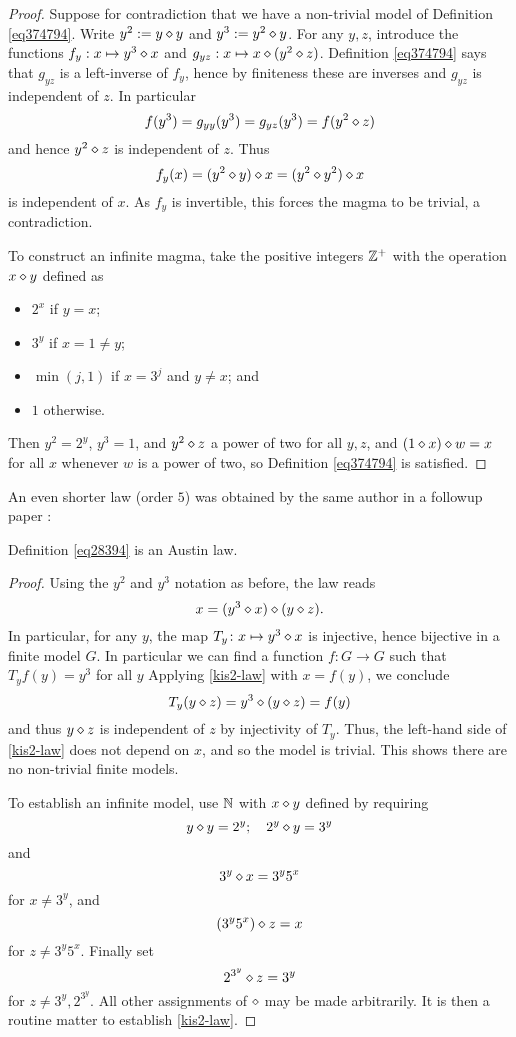 \begin{proof} \leanok Suppose for contradiction that we have a non-trivial model of Definition \ref{eq374794}. Write $y^2 := y \diamond y$ and $y^3 := y^2 \diamond y$. For any $y,z$, introduce the functions $f_y: x \mapsto y^3 \diamond x$ and $g_{yz}: x \mapsto x \diamond (y^2 \diamond z)$.  Definition \ref{eq374794} says that $g_{yz}$ is a left-inverse of $f_y$, hence by finiteness these are inverses and $g_{yz}$ is independent of $z$. In particular
$$ f(y^3) = g_{yy}(y^3) = g_{yz}(y^3) = f(y^2 \diamond z)$$
and hence $y^2 \diamond z$ is independent of $z$.  Thus
$$ f_y(x) = (y^2 \diamond y) \diamond x = (y^2 \diamond y^2) \diamond x$$
is independent of $x$.  As $f_y$ is invertible, this forces the magma to be trivial, a contradiction.

To construct an infinite magma, take the positive integers $\mathbb{Z}^+$ with the operation $x \diamond y$ defined as
\begin{itemize}
  \item $2^x$ if $y=x$;
  \item $3^y$ if $x = 1 \neq y$;
  \item $\min(j,1)$ if $x=3^j$ and $y \neq x$; and
  \item $1$ otherwise.
\end{itemize}
Then $y^2 = 2^y$, $y^3 = 1$, and $y^2 \diamond z$ a power of two for all $y, z$, and $(1 \diamond x) \diamond w = x$ for all $x$ whenever $w$ is a power of two, so Definition \ref{eq374794} is satisfied.
\end{proof}

An even shorter law (order $5$) was obtained by the same author in a followup paper \cite{Kisielewicz2}:

\begin{theorem}\label{kis-thm2} Definition \ref{eq28394} is an Austin law.
\end{theorem}

\begin{proof} Using the $y^2$ and $y^3$ notation as before, the law reads
\begin{equation}\label{kis2-law}
   x = (y^3 \diamond x) \diamond (y \diamond z).
  \end{equation}
In particular, for any $y$, the map $T_y \colon x \mapsto y^3 \diamond x$ is injective, hence bijective in a finite model $G$.  In particular we can find a function $f : G \to G$ such that $T_y f(y) = y^3$ for all $y$  Applying \eqref{kis2-law} with $x = f(y)$, we conclude
$$ T_y(y \diamond z) = y^3 \diamond (y \diamond z) = f(y) $$
and thus $y \diamond z$ is independent of $z$ by injectivity of $T_y$.  Thus, the left-hand side of \eqref{kis2-law} does not depend on $x$, and so the model is trivial.  This shows there are no non-trivial finite models.

To establish an infinite model, use $\mathbb{N}$ with $x \diamond y$ defined by requiring
$$ y \diamond y = 2^y; \quad 2^y \diamond y = 3^y$$
and
$$ 3^y \diamond x = 3^y 5^x$$
for $x \neq 3^y$, and
$$ (3^y 5^x) \diamond z = x$$
for $z \neq 3^y 5^x$.  Finally set
$$ 2^{3^y} \diamond z = 3^y$$
for $z \neq 3^y, 2^{3^y}$.  All other assignments of $\diamond$ may be made arbitrarily. It is then a routine matter to establish \eqref{kis2-law}.
\end{proof}

